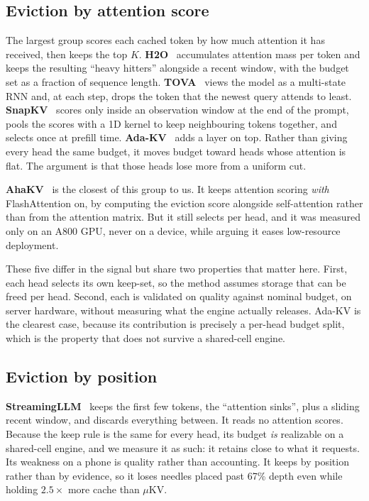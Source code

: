\documentclass[11pt]{article}
\begin{document}
\subsection{Eviction by attention score}
The largest group scores each cached token by how much attention it has received, then keeps
the top $K$. \textbf{H2O}~\cite{h2o} accumulates attention mass per token and keeps the
resulting ``heavy hitters'' alongside a recent window, with the budget set as a fraction of
sequence length. \textbf{TOVA}~\cite{tova} views the model as a multi-state RNN and, at each
step, drops the token that the newest query attends to least. \textbf{SnapKV}~\cite{snapkv}
scores only inside an observation window at the end of the prompt, pools the scores with a
1D kernel to keep neighbouring tokens together, and selects once at prefill time.
\textbf{Ada-KV}~\cite{adakv} adds a layer on top. Rather than giving every head the same
budget, it moves budget toward heads whose attention is flat. The argument is that those heads
lose more from a uniform cut.

\textbf{AhaKV}~\cite{ahakv} is the closest of this group to us. It keeps attention scoring
\emph{with} FlashAttention on, by computing the eviction score alongside self-attention rather
than from the attention matrix. But it still selects per head, and it was measured only on an
A800 GPU, never on a device, while arguing it eases low-resource deployment.

These five differ in the signal but share two properties that matter here. First, each head
selects its own keep-set, so the method assumes storage that can be freed per head. Second,
each is validated on quality against nominal budget, on server hardware, without measuring
what the engine actually releases. Ada-KV is the clearest case, because its contribution is
precisely a per-head budget split, which is the property that does not survive a shared-cell
engine.

\subsection{Eviction by position}
\textbf{StreamingLLM}~\cite{streamingllm} keeps the first few tokens, the ``attention
sinks'', plus a sliding recent window, and discards everything between. It reads no attention
scores. Because the keep rule is the same for every head, its budget \emph{is} realizable on a
shared-cell engine, and we measure it as such: it retains close to what it requests. Its
weakness on a phone is quality rather than accounting. It keeps by position rather than by
evidence, so it loses needles placed past 67\% depth even while holding $2.5\times$ more cache
than $\mu$KV.
\end{document}
